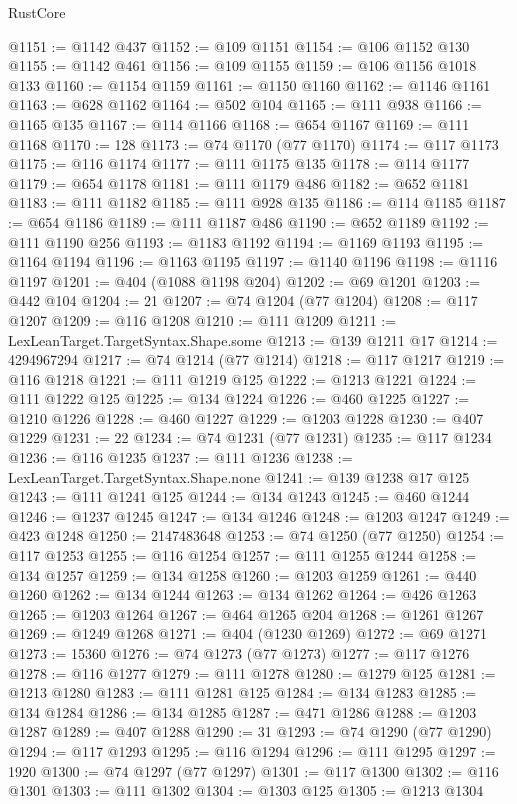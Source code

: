 \begin{lexlean}{RustCore}
\begin{coremodule}
@1151 := @1142 @437
@1152 := @109 @1151
@1154 := @106 @1152 @130
@1155 := @1142 @461
@1156 := @109 @1155
@1159 := @106 @1156 @1018 @133
@1160 := @1154 @1159
@1161 := @1150 @1160
@1162 := @1146 @1161
@1163 := @628 @1162
@1164 := @502 @104
@1165 := @111 @938
@1166 := @1165 @135
@1167 := @114 @1166
@1168 := @654 @1167
@1169 := @111 @1168
@1170 := 128
@1173 := @74 @1170 (@77 @1170)
@1174 := @117 @1173
@1175 := @116 @1174
@1177 := @111 @1175 @135
@1178 := @114 @1177
@1179 := @654 @1178
@1181 := @111 @1179 @486
@1182 := @652 @1181
@1183 := @111 @1182
@1185 := @111 @928 @135
@1186 := @114 @1185
@1187 := @654 @1186
@1189 := @111 @1187 @486
@1190 := @652 @1189
@1192 := @111 @1190 @256
@1193 := @1183 @1192
@1194 := @1169 @1193
@1195 := @1164 @1194
@1196 := @1163 @1195
@1197 := @1140 @1196
@1198 := @1116 @1197
@1201 := @404 (@1088 @1198 @204)
@1202 := @69 @1201
@1203 := @442 @104
@1204 := 21
@1207 := @74 @1204 (@77 @1204)
@1208 := @117 @1207
@1209 := @116 @1208
@1210 := @111 @1209
@1211 := LexLeanTarget.TargetSyntax.Shape.some
@1213 := @139 @1211 @17
@1214 := 4294967294
@1217 := @74 @1214 (@77 @1214)
@1218 := @117 @1217
@1219 := @116 @1218
@1221 := @111 @1219 @125
@1222 := @1213 @1221
@1224 := @111 @1222 @125
@1225 := @134 @1224
@1226 := @460 @1225
@1227 := @1210 @1226
@1228 := @460 @1227
@1229 := @1203 @1228
@1230 := @407 @1229
@1231 := 22
@1234 := @74 @1231 (@77 @1231)
@1235 := @117 @1234
@1236 := @116 @1235
@1237 := @111 @1236
@1238 := LexLeanTarget.TargetSyntax.Shape.none
@1241 := @139 @1238 @17 @125
@1243 := @111 @1241 @125
@1244 := @134 @1243
@1245 := @460 @1244
@1246 := @1237 @1245
@1247 := @134 @1246
@1248 := @1203 @1247
@1249 := @423 @1248
@1250 := 2147483648
@1253 := @74 @1250 (@77 @1250)
@1254 := @117 @1253
@1255 := @116 @1254
@1257 := @111 @1255 @1244
@1258 := @134 @1257
@1259 := @134 @1258
@1260 := @1203 @1259
@1261 := @440 @1260
@1262 := @134 @1244
@1263 := @134 @1262
@1264 := @426 @1263
@1265 := @1203 @1264
@1267 := @464 @1265 @204
@1268 := @1261 @1267
@1269 := @1249 @1268
@1271 := @404 (@1230 @1269)
@1272 := @69 @1271
@1273 := 15360
@1276 := @74 @1273 (@77 @1273)
@1277 := @117 @1276
@1278 := @116 @1277
@1279 := @111 @1278
@1280 := @1279 @125
@1281 := @1213 @1280
@1283 := @111 @1281 @125
@1284 := @134 @1283
@1285 := @134 @1284
@1286 := @134 @1285
@1287 := @471 @1286
@1288 := @1203 @1287
@1289 := @407 @1288
@1290 := 31
@1293 := @74 @1290 (@77 @1290)
@1294 := @117 @1293
@1295 := @116 @1294
@1296 := @111 @1295
@1297 := 1920
@1300 := @74 @1297 (@77 @1297)
@1301 := @117 @1300
@1302 := @116 @1301
@1303 := @111 @1302
@1304 := @1303 @125
@1305 := @1213 @1304

\end{coremodule}
\end{lexlean}
